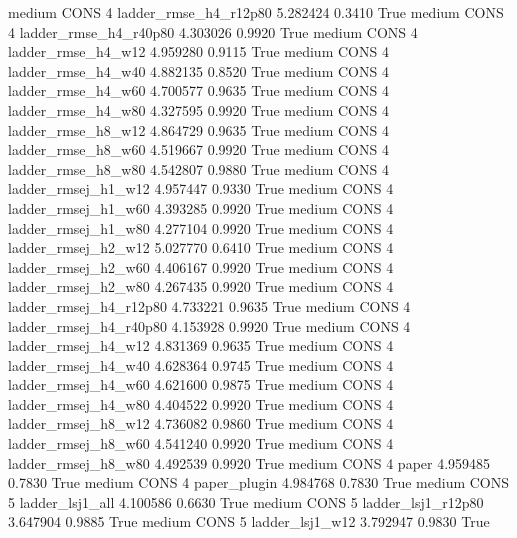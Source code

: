     medium     CONS                 4  ladder_rmse_h4_r12p80   5.282424      0.3410    True
    medium     CONS                 4  ladder_rmse_h4_r40p80   4.303026      0.9920    True
    medium     CONS                 4     ladder_rmse_h4_w12   4.959280      0.9115    True
    medium     CONS                 4     ladder_rmse_h4_w40   4.882135      0.8520    True
    medium     CONS                 4     ladder_rmse_h4_w60   4.700577      0.9635    True
    medium     CONS                 4     ladder_rmse_h4_w80   4.327595      0.9920    True
    medium     CONS                 4     ladder_rmse_h8_w12   4.864729      0.9635    True
    medium     CONS                 4     ladder_rmse_h8_w60   4.519667      0.9920    True
    medium     CONS                 4     ladder_rmse_h8_w80   4.542807      0.9880    True
    medium     CONS                 4    ladder_rmsej_h1_w12   4.957447      0.9330    True
    medium     CONS                 4    ladder_rmsej_h1_w60   4.393285      0.9920    True
    medium     CONS                 4    ladder_rmsej_h1_w80   4.277104      0.9920    True
    medium     CONS                 4    ladder_rmsej_h2_w12   5.027770      0.6410    True
    medium     CONS                 4    ladder_rmsej_h2_w60   4.406167      0.9920    True
    medium     CONS                 4    ladder_rmsej_h2_w80   4.267435      0.9920    True
    medium     CONS                 4 ladder_rmsej_h4_r12p80   4.733221      0.9635    True
    medium     CONS                 4 ladder_rmsej_h4_r40p80   4.153928      0.9920    True
    medium     CONS                 4    ladder_rmsej_h4_w12   4.831369      0.9635    True
    medium     CONS                 4    ladder_rmsej_h4_w40   4.628364      0.9745    True
    medium     CONS                 4    ladder_rmsej_h4_w60   4.621600      0.9875    True
    medium     CONS                 4    ladder_rmsej_h4_w80   4.404522      0.9920    True
    medium     CONS                 4    ladder_rmsej_h8_w12   4.736082      0.9860    True
    medium     CONS                 4    ladder_rmsej_h8_w60   4.541240      0.9920    True
    medium     CONS                 4    ladder_rmsej_h8_w80   4.492539      0.9920    True
    medium     CONS                 4                  paper   4.959485      0.7830    True
    medium     CONS                 4           paper_plugin   4.984768      0.7830    True
    medium     CONS                 5        ladder_lsj1_all   4.100586      0.6630    True
    medium     CONS                 5     ladder_lsj1_r12p80   3.647904      0.9885    True
    medium     CONS                 5        ladder_lsj1_w12   3.792947      0.9830    True

